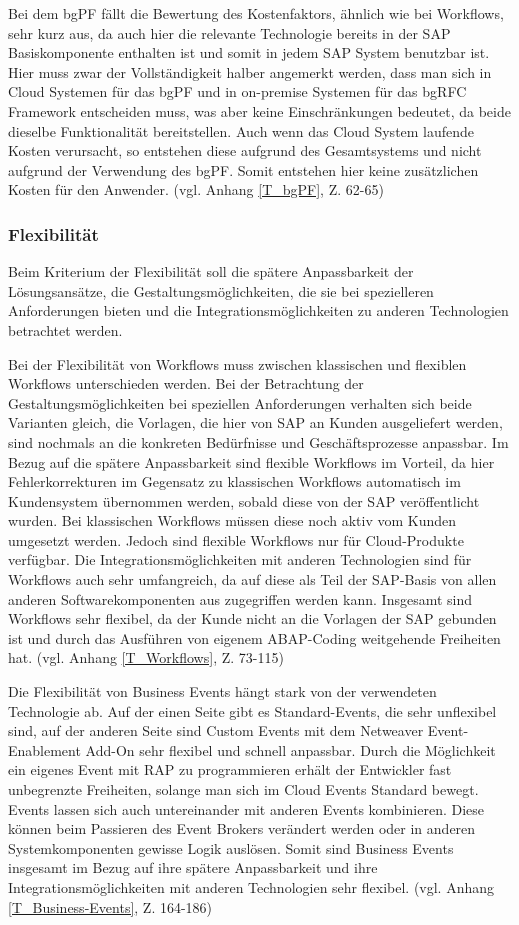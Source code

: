 Bei dem bgPF fällt die Bewertung des Kostenfaktors, ähnlich wie bei Workflows, sehr kurz aus, da auch hier die relevante Technologie bereits in der SAP Basiskomponente enthalten ist und somit in jedem SAP System benutzbar ist. Hier muss zwar der Vollständigkeit halber angemerkt werden, dass man sich in Cloud Systemen für das bgPF und in on-premise Systemen für das bgRFC Framework entscheiden muss, was aber keine Einschränkungen bedeutet, da beide dieselbe Funktionalität bereitstellen. Auch wenn das Cloud System laufende Kosten verursacht, so entstehen diese aufgrund des Gesamtsystems und nicht aufgrund der Verwendung des bgPF. Somit entstehen hier keine zusätzlichen Kosten für den Anwender. (vgl. Anhang \ref{T_bgPF}, Z. 62-65)

\subsubsection{Flexibilität}

Beim Kriterium der Flexibilität soll die spätere Anpassbarkeit der Lösungsansätze, die Gestaltungsmöglichkeiten, die sie bei spezielleren Anforderungen bieten und die Integrationsmöglichkeiten zu anderen Technologien betrachtet werden.

Bei der Flexibilität von Workflows muss zwischen klassischen und flexiblen Workflows unterschieden werden. Bei der Betrachtung der Gestaltungsmöglichkeiten bei speziellen Anforderungen verhalten sich beide Varianten gleich, die Vorlagen, die hier von SAP an Kunden ausgeliefert werden, sind nochmals an die konkreten Bedürfnisse und Geschäftsprozesse anpassbar. Im Bezug auf die spätere Anpassbarkeit sind flexible Workflows im Vorteil, da hier Fehlerkorrekturen im Gegensatz zu klassischen Workflows automatisch im Kundensystem übernommen werden, sobald diese von der SAP veröffentlicht wurden. Bei klassischen Workflows müssen diese noch aktiv vom Kunden umgesetzt werden. Jedoch sind flexible Workflows nur für Cloud-Produkte verfügbar. Die Integrationsmöglichkeiten mit anderen Technologien sind für Workflows auch sehr umfangreich, da auf diese als Teil der SAP-Basis von allen anderen Softwarekomponenten aus zugegriffen werden kann. Insgesamt sind Workflows sehr flexibel, da der Kunde nicht an die Vorlagen der SAP gebunden ist und durch das Ausführen von eigenem ABAP-Coding weitgehende Freiheiten hat. (vgl. Anhang \ref{T_Workflows}, Z. 73-115)

Die Flexibilität von Business Events hängt stark von der verwendeten Technologie ab. Auf der einen Seite gibt es Standard-Events, die sehr unflexibel sind, auf der anderen Seite sind Custom Events mit dem Netweaver Event-Enablement Add-On sehr flexibel und schnell anpassbar. Durch die Möglichkeit ein eigenes Event mit RAP zu programmieren erhält der Entwickler fast unbegrenzte Freiheiten, solange man sich im Cloud Events Standard bewegt. Events lassen sich auch untereinander mit anderen Events kombinieren. Diese können \zB beim Passieren des Event Brokers verändert werden oder in anderen Systemkomponenten gewisse Logik auslösen. Somit sind Business Events insgesamt im Bezug auf ihre spätere Anpassbarkeit und ihre Integrationsmöglichkeiten mit anderen Technologien sehr flexibel. (vgl. Anhang \ref{T_Business-Events}, Z. 164-186)


